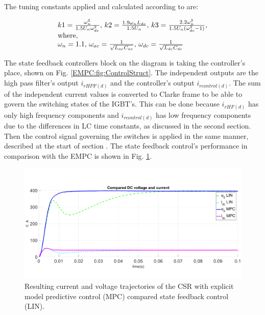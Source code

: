     The tuning constants applied and calculated according to \cite{godlewska2015predictive} are:

    \begin{equation}
        \begin{array}{l}
            k1=\frac{\omega^3_n}{1.5U_n\omega^2_{dc}},\,k2=\frac{1.9\omega_n L_{dc}}{1.5U_n},\,k3=\frac{2.2\omega^2_n}{1.5U_n(\omega^2_{dc}-1)},\\
            \textnormal{where,}\\
            \omega_n=1.1,\,\omega_{ac}=\frac{1}{\sqrt{L_{ac}C_{ac}}},\,\omega_{dc}=\frac{1}{\sqrt{L_{dc}C_{dc}}}
        \end{array}
        \label{EMPC:equ:tuning}
    \end{equation}

    The state feedback controllers block on the diagram is taking the controller's place, shown on Fig. \ref{EMPC:fig:ControlStruct}. The independent outputs are the high pass filter's output  $i_{rHPF(d)}$ and the controller's output $i_{rcontrol(d)}$. The sum of the independent current values is converted to Clarke frame to be able to govern the switching states of the IGBT's. This can be done because $i_{rHF(d)}$ has only high frequency components and $i_{rcontrol(d)}$ has low frequency components due to the differences in LC time constants, as discussed in the second section. Then the control signal governing the switches is applied in the same manner, described at the start of section .
    The state feedback control's performance in comparison with the EMPC is shown in Fig. \ref{EMPC:fig:Result_EMPCfinal}.

    \begin{figure}[!ht]
        \centering
        \includegraphics[width=\textwidth]{EMPC_PNG_Pics/Result_EMPCfinal.png}
        \caption{Resulting current and voltage trajectories of the CSR with explicit model predictive control (MPC) compared state feedback control (LIN).}
        \label{EMPC:fig:Result_EMPCfinal}
    \end{figure}

